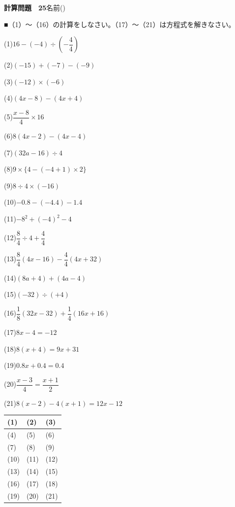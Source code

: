 \documentclass[a4paper,11pt]{ltjsarticle}
\newlength{\qcol}\setlength{\qcol}{0.47\textwidth}
\newlength{\qgap}
\newlength{\anscolw}\setlength{\anscolw}{0.30\textwidth}
\newlength{\ansh}
\newcommand{\Q}[2]{\parbox[t]{\qcol}{\raggedright (#1)\hspace{0.6em}$\displaystyle #2$}}
\newcommand{\QR}[4]{\Q{#1}{#2}\hfill\Q{#3}{#4}\par\vspace{\qgap}}
\newcommand{\anscell}[1]{\rule[-\ansdrop]{0pt}{\ansh}(#1)}
\newlength{\ansdrop}
\begin{document}
{\large\bfseries 計算問題　25}\hfill 名前(\underline{\hspace{32mm}})\par\vspace{3mm}
■（1）〜（16）の計算をしなさい。（17）〜（21）は方程式を解きなさい。\par\vspace{3mm}
\setlength{\qgap}{5.4mm}
\QR{1}{16-(-4)\div\left(-\dfrac{4}{4}\right)}{2}{(-15)+(-7)-(-9)}
\QR{3}{(-12)\times(-6)}{4}{(4x-8)-(4x+4)}
\QR{5}{\dfrac{x-8}{4}\times16}{6}{8(4x-2)-(4x-4)}
\QR{7}{(32a-16)\div4}{8}{9\times\{4-(-4+1)\times2\}}
\QR{9}{8\div4\times(-16)}{10}{-0.8-(-4.4)-1.4}
\QR{11}{-8^2+(-4)^2-4}{12}{\dfrac{8}{4}\div4+\dfrac{4}{4}}
\QR{13}{\dfrac{8}{4}(4x-16)-\dfrac{4}{4}(4x+32)}{14}{(8a+4)+(4a-4)}
\QR{15}{(-32)\div(+4)}{16}{\dfrac{1}{8}(32x-32)+\dfrac{1}{4}(16x+16)}
\QR{17}{8x-4=-12}{18}{8(x+4)=9x+31}
\QR{19}{0.8x+0.4=0.4}{20}{\dfrac{x-3}{4}=\dfrac{x+1}{2}}
\vspace{1mm}
\Q{21}{8(x-2)-4(x+1)=12x-12}\par\vspace{3mm}
\setlength{\ansh}{9.5mm}\setlength{\ansdrop}{6mm}%
\begin{center}\begin{tabular}{|p{\anscolw}|p{\anscolw}|p{\anscolw}|}\hline
\anscell{1} & \anscell{2} & \anscell{3} \\\hline
\anscell{4} & \anscell{5} & \anscell{6} \\\hline
\anscell{7} & \anscell{8} & \anscell{9} \\\hline
\anscell{10} & \anscell{11} & \anscell{12} \\\hline
\anscell{13} & \anscell{14} & \anscell{15} \\\hline
\anscell{16} & \anscell{17} & \anscell{18} \\\hline
\anscell{19} & \anscell{20} & \anscell{21} \\\hline
\end{tabular}\end{center}
\end{document}
